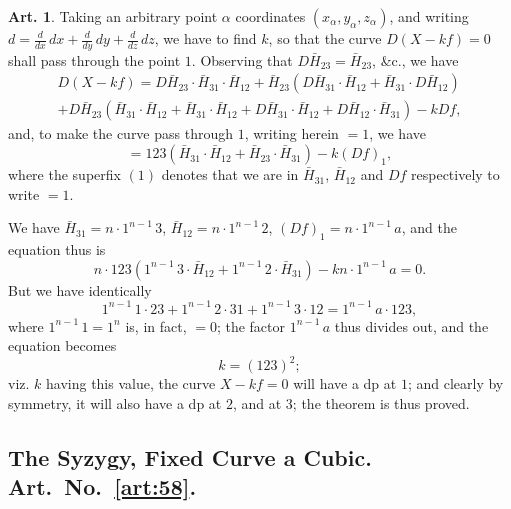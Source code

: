 \documentclass[12pt,a4paper]{article}
\theoremstyle{definition}
\newtheorem{art}{Art.}[section]
\begin{document}
\begin{art}\label{art:57}
Taking an arbitrary point $\alpha$ coordinates $(x_\alpha, y_\alpha, z_\alpha)$, and writing $d = \frac{d}{dx}\,dx + \frac{d}{dy}\,dy + \frac{d}{dz}\,dz$, we have to find $k$, so that the curve $D(X - kf) = 0$ shall pass through the point $1$. Observing that $D\bar{H}_{23} = \bar{H}_{23}$, \&c., we have
\begin{multline*}
D(X - kf) = D\bar{H}_{23} \cdot \bar{H}_{31} \cdot \bar{H}_{12} + \bar{H}_{23}(D\bar{H}_{31} \cdot \bar{H}_{12} + \bar{H}_{31} \cdot D\bar{H}_{12}) \\
+ D\bar{H}_{23}(\bar{H}_{31} \cdot \bar{H}_{12} + \bar{H}_{31} \cdot \bar{H}_{12} + D\bar{H}_{31} \cdot \bar{H}_{12} + D\bar{H}_{12} \cdot \bar{H}_{31}) - kDf,
\end{multline*}
and, to make the curve pass through $1$, writing herein $= 1$, we have
\[
= 123(\bar{H}_{31} \cdot \bar{H}_{12} + \bar{H}_{23} \cdot \bar{H}_{31}) - k(Df)_1,
\]
where the superfix $(1)$ denotes that we are in $\bar{H}_{31}$, $\bar{H}_{12}$ and $Df$ respectively to write $= 1$.

We have $\bar{H}_{31} = n \cdot 1^{n-1}\,3$, $\bar{H}_{12} = n \cdot 1^{n-1}\,2$, $(Df)_1 = n \cdot 1^{n-1}\,a$, and the equation thus is
\[
n \cdot 123(1^{n-1}\,3 \cdot \bar{H}_{12} + 1^{n-1}\,2 \cdot \bar{H}_{31}) - kn \cdot 1^{n-1}\,a = 0.
\]
But we have identically
\[
1^{n-1}\,1 \cdot 23 + 1^{n-1}\,2 \cdot 31 + 1^{n-1}\,3 \cdot 12 = 1^{n-1}\,a \cdot 123,
\]
where $1^{n-1}\,1 = 1^n$ is, in fact, $= 0$; the factor $1^{n-1}\,a$ thus divides out, and the equation becomes
\[
k = (123)^2;
\]
viz. $k$ having this value, the curve $X - kf = 0$ will have a dp at $1$; and clearly by symmetry, it will also have a dp at $2$, and at $3$; the theorem is thus proved.
\end{art}

\newpage
\subsection*{The Syzygy, Fixed Curve a Cubic. Art.~No.~\ref{art:58}.}
\end{document}
